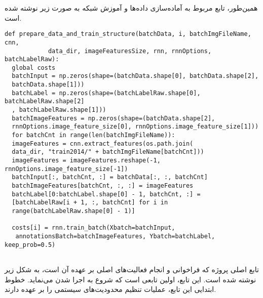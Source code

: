 همین‌طور، تابع مربوط به آماده‌سازی داد‌ه‌‌ها و آموزش شبکه به صورت زیر نوشته شده‌ است.
\begin{latin}
\begin{verbatim}
def prepare_data_and_train_structure(batchData, i, batchImgFileName, cnn,
            data_dir, imageFeaturesSize, rnn, rnnOptions, batchLabelRaw):
  global costs
  batchInput = np.zeros(shape=(batchData.shape[0], batchData.shape[2], 
  batchData.shape[1]))
  batchLabel = np.zeros(shape=(batchLabelRaw.shape[0], batchLabelRaw.shape[2]
  , batchLabelRaw.shape[1]))
  batchImageFeatures = np.zeros(shape=(batchData.shape[2],
  rnnOptions.image_feature_size[0], rnnOptions.image_feature_size[1]))
  for batchCnt in range(len(batchImgFileName)):
  imageFeatures = cnn.extract_features(os.path.join(
  data_dir, "train2014/" + batchImgFileName[batchCnt]))
  imageFeatures = imageFeatures.reshape(-1, rnnOptions.image_feature_size[-1])
  batchInput[:, batchCnt, :] = batchData[:, :, batchCnt]
  batchImageFeatures[batchCnt, :, :] = imageFeatures
  batchLabel[0:batchLabel.shape[0] - 1, batchCnt, :] = 
  [batchLabelRaw[i + 1, :, batchCnt] for i in
  range(batchLabelRaw.shape[0] - 1)]

  costs[i] = rnn.train_batch(Xbatch=batchInput,
   annotationsBatch=batchImageFeatures, Ybatch=batchLabel, keep_prob=0.5)


\end{verbatim}	
\end{latin}

تابع اصلی پروژه که فراخوانی و انجام فعالیت‌های اصلی بر عهده آن است، به شکل زیر نوشته شده است. این تابع، اولین تابعی است که شروع به اجرا شدن می‌نماید. خطوط ابتدایی این تابع، عملیات تنظیم محدودیت‌های سیستمی را بر عهده دارند.

